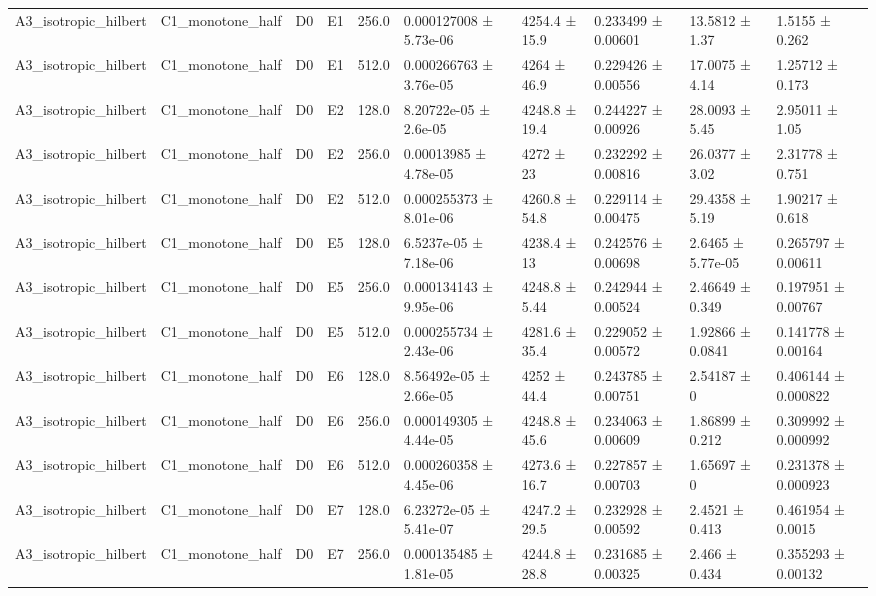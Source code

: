 \begin{table}
\begin{tabular}{llllllllll}
A3\_isotropic\_hilbert & C1\_monotone\_half & D0 & E1 & 256.0 & 0.000127008 ± 5.73e-06 & 4254.4 ± 15.9 & 0.233499 ± 0.00601 & 13.5812 ± 1.37 & 1.5155 ± 0.262 \\
A3\_isotropic\_hilbert & C1\_monotone\_half & D0 & E1 & 512.0 & 0.000266763 ± 3.76e-05 & 4264 ± 46.9 & 0.229426 ± 0.00556 & 17.0075 ± 4.14 & 1.25712 ± 0.173 \\
A3\_isotropic\_hilbert & C1\_monotone\_half & D0 & E2 & 128.0 & 8.20722e-05 ± 2.6e-05 & 4248.8 ± 19.4 & 0.244227 ± 0.00926 & 28.0093 ± 5.45 & 2.95011 ± 1.05 \\
A3\_isotropic\_hilbert & C1\_monotone\_half & D0 & E2 & 256.0 & 0.00013985 ± 4.78e-05 & 4272 ± 23 & 0.232292 ± 0.00816 & 26.0377 ± 3.02 & 2.31778 ± 0.751 \\
A3\_isotropic\_hilbert & C1\_monotone\_half & D0 & E2 & 512.0 & 0.000255373 ± 8.01e-06 & 4260.8 ± 54.8 & 0.229114 ± 0.00475 & 29.4358 ± 5.19 & 1.90217 ± 0.618 \\
A3\_isotropic\_hilbert & C1\_monotone\_half & D0 & E5 & 128.0 & 6.5237e-05 ± 7.18e-06 & 4238.4 ± 13 & 0.242576 ± 0.00698 & 2.6465 ± 5.77e-05 & 0.265797 ± 0.00611 \\
A3\_isotropic\_hilbert & C1\_monotone\_half & D0 & E5 & 256.0 & 0.000134143 ± 9.95e-06 & 4248.8 ± 5.44 & 0.242944 ± 0.00524 & 2.46649 ± 0.349 & 0.197951 ± 0.00767 \\
A3\_isotropic\_hilbert & C1\_monotone\_half & D0 & E5 & 512.0 & 0.000255734 ± 2.43e-06 & 4281.6 ± 35.4 & 0.229052 ± 0.00572 & 1.92866 ± 0.0841 & 0.141778 ± 0.00164 \\
A3\_isotropic\_hilbert & C1\_monotone\_half & D0 & E6 & 128.0 & 8.56492e-05 ± 2.66e-05 & 4252 ± 44.4 & 0.243785 ± 0.00751 & 2.54187 ± 0 & 0.406144 ± 0.000822 \\
A3\_isotropic\_hilbert & C1\_monotone\_half & D0 & E6 & 256.0 & 0.000149305 ± 4.44e-05 & 4248.8 ± 45.6 & 0.234063 ± 0.00609 & 1.86899 ± 0.212 & 0.309992 ± 0.000992 \\
A3\_isotropic\_hilbert & C1\_monotone\_half & D0 & E6 & 512.0 & 0.000260358 ± 4.45e-06 & 4273.6 ± 16.7 & 0.227857 ± 0.00703 & 1.65697 ± 0 & 0.231378 ± 0.000923 \\
A3\_isotropic\_hilbert & C1\_monotone\_half & D0 & E7 & 128.0 & 6.23272e-05 ± 5.41e-07 & 4247.2 ± 29.5 & 0.232928 ± 0.00592 & 2.4521 ± 0.413 & 0.461954 ± 0.0015 \\
A3\_isotropic\_hilbert & C1\_monotone\_half & D0 & E7 & 256.0 & 0.000135485 ± 1.81e-05 & 4244.8 ± 28.8 & 0.231685 ± 0.00325 & 2.466 ± 0.434 & 0.355293 ± 0.00132 \\

\end{tabular}
\end{table}
